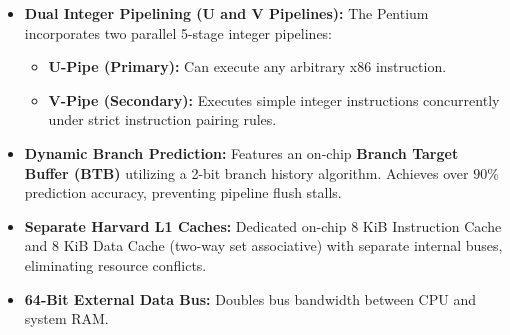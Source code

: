 \documentclass[12pt,a4paper]{article}
\begin{document}
\begin{itemize}[leftmargin=*]
  \item \textbf{Dual Integer Pipelining (U and V Pipelines):} The Pentium incorporates two parallel 5-stage integer pipelines:
  \begin{itemize}[leftmargin=*]
    \item \textbf{U-Pipe (Primary):} Can execute any arbitrary x86 instruction.
    \item \textbf{V-Pipe (Secondary):} Executes simple integer instructions concurrently under strict instruction pairing rules.
  \end{itemize}
  \item \textbf{Dynamic Branch Prediction:} Features an on-chip \textbf{Branch Target Buffer (BTB)} utilizing a 2-bit branch history algorithm. Achieves over $90\%$ prediction accuracy, preventing pipeline flush stalls.
  \item \textbf{Separate Harvard L1 Caches:} Dedicated on-chip 8 KiB Instruction Cache and 8 KiB Data Cache (two-way set associative) with separate internal buses, eliminating resource conflicts.
  \item \textbf{64-Bit External Data Bus:} Doubles bus bandwidth between CPU and system RAM.
\end{itemize}
\end{document}
